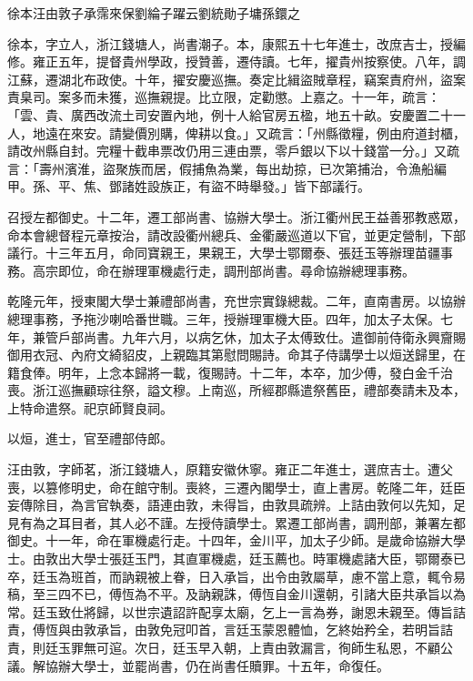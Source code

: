 
\begin{pinyinscope}
徐本汪由敦子承霈來保劉綸子躍云劉統勛子墉孫鐶之

徐本，字立人，浙江錢塘人，尚書潮子。本，康熙五十七年進士，改庶吉士，授編修。雍正五年，提督貴州學政，授贊善，遷侍讀。七年，擢貴州按察使。八年，調江蘇，遷湖北布政使。十年，擢安慶巡撫。奏定比緝盜賊章程，竊案責府州，盜案責臬司。案多而未獲，巡撫親提。比立限，定勸懲。上嘉之。十一年，疏言：「雲、貴、廣西改流土司安置內地，例十人給官房五楹，地五十畝。安慶置二十一人，地遠在來安。請變價別購，俾耕以食。」又疏言：「州縣徵糧，例由府道封櫃，請改州縣自封。完糧十截串票改仍用三連由票，零戶銀以下以十錢當一分。」又疏言：「壽州濱淮，盜聚族而居，假捕魚為業，每出劫掠，已次第捕治，令漁船編甲。孫、平、焦、鄧諸姓設族正，有盜不時舉發。」皆下部議行。

召授左都御史。十二年，遷工部尚書、協辦大學士。浙江衢州民王益善邪教惑眾，命本會總督程元章按治，請改設衢州總兵、金衢嚴巡道以下官，並更定營制，下部議行。十三年五月，命同寶親王，果親王，大學士鄂爾泰、張廷玉等辦理苗疆事務。高宗即位，命在辦理軍機處行走，調刑部尚書。尋命協辦總理事務。

乾隆元年，授東閣大學士兼禮部尚書，充世宗實錄總裁。二年，直南書房。以協辦總理事務，予拖沙喇哈番世職。三年，授辦理軍機大臣。四年，加太子太保。七年，兼管戶部尚書。九年六月，以病乞休，加太子太傅致仕。遣御前侍衛永興齎賜御用衣冠、內府文綺貂皮，上親臨其第慰問賜詩。命其子侍講學士以烜送歸里，在籍食俸。明年，上念本歸將一載，復賜詩。十二年，本卒，加少傅，發白金千治喪。浙江巡撫顧琮往祭，謚文穆。上南巡，所經郡縣遣祭舊臣，禮部奏請未及本，上特命遣祭。祀京師賢良祠。

以烜，進士，官至禮部侍郎。

汪由敦，字師茗，浙江錢塘人，原籍安徽休寧。雍正二年進士，選庶吉士。遭父喪，以篡修明史，命在館守制。喪終，三遷內閣學士，直上書房。乾隆二年，廷臣妄傳除目，為言官執奏，語連由敦，未得旨，由敦具疏辨。上詰由敦何以先知，足見有為之耳目者，其人必不謹。左授侍讀學士。累遷工部尚書，調刑部，兼署左都御史。十一年，命在軍機處行走。十四年，金川平，加太子少師。是歲命協辦大學士。由敦出大學士張廷玉門，其直軍機處，廷玉薦也。時軍機處諸大臣，鄂爾泰已卒，廷玉為班首，而訥親被上眷，日入承旨，出令由敦屬草，慮不當上意，輒令易稿，至三四不已，傅恆為不平。及訥親誅，傅恆自金川還朝，引諸大臣共承旨以為常。廷玉致仕將歸，以世宗遺詔許配享太廟，乞上一言為券，謝恩未親至。傳旨詰責，傅恆與由敦承旨，由敦免冠叩首，言廷玉蒙恩體恤，乞終始矜全，若明旨詰責，則廷玉罪無可逭。次日，廷玉早入朝，上責由敦漏言，徇師生私恩，不顧公議。解協辦大學士，並罷尚書，仍在尚書任贖罪。十五年，命復任。


\end{pinyinscope}
